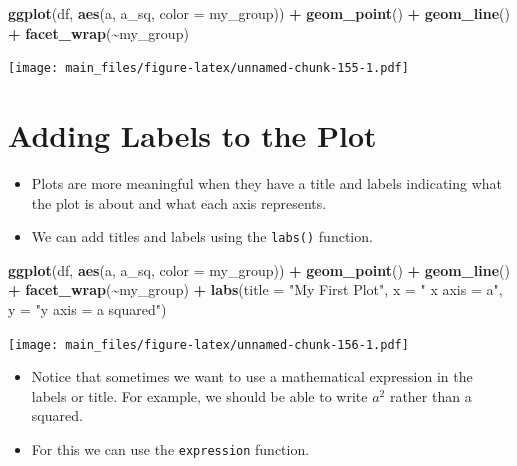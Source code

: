\documentclass[
]{book}
\newenvironment{Shaded}{\begin{snugshade}}{\end{snugshade}}
\newcommand{\AttributeTok}[1]{\textcolor[rgb]{0.13,0.29,0.53}{#1}}
\newcommand{\FunctionTok}[1]{\textcolor[rgb]{0.13,0.29,0.53}{\textbf{#1}}}
\newcommand{\NormalTok}[1]{#1}
\newcommand{\SpecialCharTok}[1]{\textcolor[rgb]{0.81,0.36,0.00}{\textbf{#1}}}
\newcommand{\StringTok}[1]{\textcolor[rgb]{0.31,0.60,0.02}{#1}}
\providecommand{\tightlist}{%
  \setlength{\itemsep}{0pt}\setlength{\parskip}{0pt}}
\begin{document}
\begin{Shaded}
\begin{Highlighting}[]
\FunctionTok{ggplot}\NormalTok{(df, }\FunctionTok{aes}\NormalTok{(a, a\_sq, }\AttributeTok{color =}\NormalTok{ my\_group)) }\SpecialCharTok{+} \FunctionTok{geom\_point}\NormalTok{()  }\SpecialCharTok{+} \FunctionTok{geom\_line}\NormalTok{() }\SpecialCharTok{+} \FunctionTok{facet\_wrap}\NormalTok{(}\SpecialCharTok{\textasciitilde{}}\NormalTok{my\_group)}
\end{Highlighting}
\end{Shaded}

\texttt{[image: main\_files/figure-latex/unnamed-chunk-155-1.pdf]}

\section{Adding Labels to the Plot}\label{adding-labels-to-the-plot}

\begin{itemize}
\tightlist
\item
  Plots are more meaningful when they have a title and labels indicating what the plot is about and what each axis represents.
\item
  We can add titles and labels using the \texttt{labs()} function.
\end{itemize}

\begin{Shaded}
\begin{Highlighting}[]
\FunctionTok{ggplot}\NormalTok{(df, }\FunctionTok{aes}\NormalTok{(a, a\_sq, }\AttributeTok{color =}\NormalTok{ my\_group)) }\SpecialCharTok{+} \FunctionTok{geom\_point}\NormalTok{()  }\SpecialCharTok{+} \FunctionTok{geom\_line}\NormalTok{() }\SpecialCharTok{+} \FunctionTok{facet\_wrap}\NormalTok{(}\SpecialCharTok{\textasciitilde{}}\NormalTok{my\_group) }\SpecialCharTok{+}
  \FunctionTok{labs}\NormalTok{(}\AttributeTok{title =} \StringTok{"My First Plot"}\NormalTok{, }\AttributeTok{x =} \StringTok{" x axis = a"}\NormalTok{, }\AttributeTok{y =} \StringTok{"y axis = a squared"}\NormalTok{)}
\end{Highlighting}
\end{Shaded}

\texttt{[image: main\_files/figure-latex/unnamed-chunk-156-1.pdf]}

\begin{itemize}
\tightlist
\item
  Notice that sometimes we want to use a mathematical expression in the labels or title. For example, we should be able to write \(a^2\) rather than a squared.
\item
  For this we can use the \texttt{expression} function.
\end{itemize}
\end{document}

